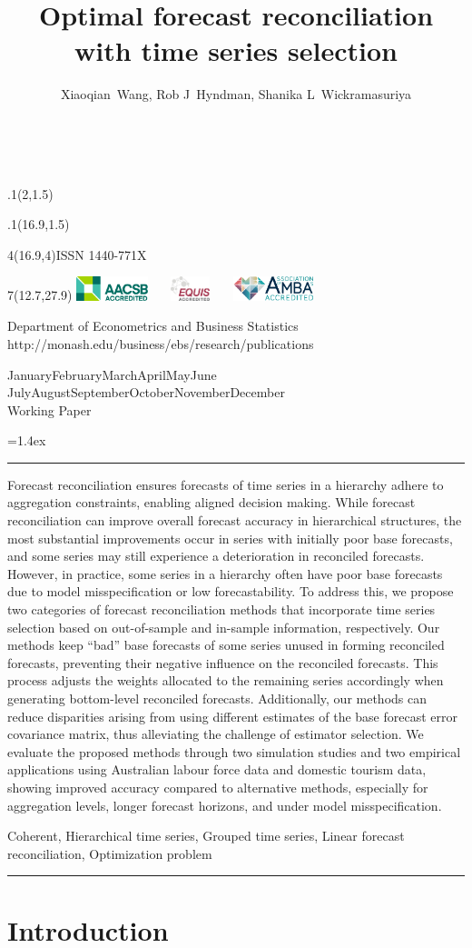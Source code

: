 \documentclass[11pt,a4paper,]{article}
\title{Optimal forecast reconciliation with time series selection}
\author{Xiaoqian~Wang, Rob J~Hyndman, Shanika L~Wickramasuriya}
\date{\sf\Date~\Month~\Year}
\makeatletter
\def\Date{\number\day}
\def\Month{\ifcase\month\or
 January\or February\or March\or April\or May\or June\or
 July\or August\or September\or October\or November\or December\fi}
\def\Year{\number\year}
\def\showjel{{\large\textsf{\textbf{JEL classification:}}~\@jel}}
\def\cover{{\sffamily\setcounter{page}{0}
        \thispagestyle{empty}
        \placefig{2}{1.5}{width=5cm}{_extensions/wp/monash2}
        \placefig{16.9}{1.5}{width=2.1cm}{_extensions/wp/MBSportrait}
        \begin{textblock}{4}(16.9,4)ISSN 1440-771X\end{textblock}
        \begin{textblock}{7}(12.7,27.9)\hfill
        \includegraphics[height=0.7cm]{_extensions/wp/AACSB}~~~
        \includegraphics[height=0.7cm]{_extensions/wp/EQUIS}~~~
        \includegraphics[height=0.7cm]{_extensions/wp/AMBA}
        \end{textblock}
        \vspace*{2cm}
        \begin{center}\Large
        Department of Econometrics and Business Statistics\\[.5cm]
        \footnotesize http://monash.edu/business/ebs/research/publications
        \end{center}\vspace{2cm}
        \begin{center}
        \fbox{\parbox{14cm}{\begin{onehalfspace}\centering\Huge\vspace*{0.3cm}
                \textsf{\textbf{\expandafter{\@title}}}\vspace{1cm}\par
                \LARGE\@author\end{onehalfspace}
        }}
        \end{center}
        \vfill
                \begin{center}\Large
                \Month~\Year\\[1cm]
                Working Paper \@wp
        \end{center}\vspace*{2cm}}}
\def\pageone{{\sffamily\setstretch{1}%
        \thispagestyle{empty}%
        \vbox to \textheight{%
        \raggedright\baselineskip=1.2cm
     {\fontsize{24.88}{30}\sffamily\textbf{\expandafter{\@title}}}
        \vspace{2cm}\par
        \hspace{1cm}\parbox{14cm}{\sffamily\large\@addresses}\vspace{1cm}\vfill
        \hspace{1cm}{\large\Date~\Month~\Year}\\[1cm]
        \hspace{1cm}\showjel\vss}}}
\def\blindtitle{{\sffamily
     \thispagestyle{plain}\raggedright\baselineskip=1.2cm
     {\fontsize{24.88}{30}\sffamily\textbf{\expandafter{\@title}}}\vspace{1cm}\par
        }}
\def\titlepage{{\cover\newpage\pageone\newpage\blindtitle}}
\let\maketitle\titlepage
\newenvironment{keywords}{\par\vspace{0.5cm}\noindent{\sffamily\textbf{Keywords:}}}{\vspace{0.25cm}\par\hrule\vspace{0.5cm}\par}
\renewenvironment{abstract}{\begin{minipage}{\textwidth}\parskip=1.4ex\noindent
\hrule\vspace{0.1cm}\par{\sffamily\textbf{\abstractname}}\newline}
  {\end{minipage}}
\def\placefig#1#2#3#4{\begin{textblock}{.1}(#1,#2)\rlap{\texttt{[image: \#4]}}\end{textblock}}
\makeatother
\begin{document}
\maketitle
\begin{abstract}
Forecast reconciliation ensures forecasts of time series in a hierarchy
adhere to aggregation constraints, enabling aligned decision making.
While forecast reconciliation can improve overall forecast accuracy in
hierarchical structures, the most substantial improvements occur in
series with initially poor base forecasts, and some series may still
experience a deterioration in reconciled forecasts. However, in
practice, some series in a hierarchy often have poor base forecasts due
to model misspecification or low forecastability. To address this, we
propose two categories of forecast reconciliation methods that
incorporate time series selection based on out-of-sample and in-sample
information, respectively. Our methods keep ``bad'' base forecasts of
some series unused in forming reconciled forecasts, preventing their
negative influence on the reconciled forecasts. This process adjusts the
weights allocated to the remaining series accordingly when generating
bottom-level reconciled forecasts. Additionally, our methods can reduce
disparities arising from using different estimates of the base forecast
error covariance matrix, thus alleviating the challenge of estimator
selection. We evaluate the proposed methods through two simulation
studies and two empirical applications using Australian labour force
data and domestic tourism data, showing improved accuracy compared to
alternative methods, especially for aggregation levels, longer forecast
horizons, and under model misspecification.
\end{abstract}
\begin{keywords}
Coherent, Hierarchical time series, Grouped time series, Linear forecast
reconciliation, Optimization problem
\end{keywords}

\ifdefined\Shaded\renewenvironment{Shaded}{\begin{tcolorbox}[frame hidden, interior hidden, borderline west={3pt}{0pt}{shadecolor}, enhanced, breakable, boxrule=0pt, sharp corners]}{\end{tcolorbox}}\fi

\hypertarget{sec-introduction}{%
\section{Introduction}\label{sec-introduction}}
\end{document}
